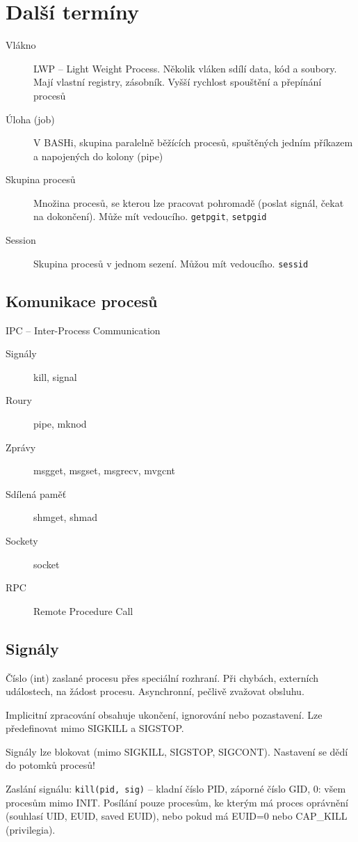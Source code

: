 \documentclass[a4paper, 11pt]{report}
\begin{document}
\section{Další termíny}
\begin{description}
	\item[Vlákno] LWP -- Light Weight Process. Několik vláken sdílí data, kód a soubory. Mají vlastní registry, zásobník. Vyšší rychlost spouštění a přepínání procesů
	\item[Úloha (job)] V BASHi, skupina paralelně běžících procesů, spuštěných jedním příkazem a napojených do kolony (pipe)
	\item[Skupina procesů] Množina procesů, se kterou lze pracovat pohromadě (poslat signál, čekat na dokončení). Může mít vedoucího. \verb|getpgit|, \verb|setpgid|
	\item[Session] Skupina procesů v jednom sezení. Můžou mít vedoucího. \verb|sessid|
\end{description}

\subsection{Komunikace procesů}
IPC -- Inter-Process Communication
\begin{description}
	\item[Signály] kill, signal
	\item[Roury] pipe, mknod
	\item[Zprávy] msgget, msgset, msgrecv, mvgcnt
	\item[Sdílená paměť] shmget, shmad
	\item[Sockety] socket
	\item[RPC] Remote Procedure Call
\end{description}

\subsection{Signály}

Číslo (int) zaslané procesu přes speciální rozhraní. Při chybách, externích událostech, na žádost procesu. Asynchronní, pečlivě zvažovat obsluhu.

Implicitní zpracování obsahuje ukončení, ignorování nebo pozastavení. Lze předefinovat mimo SIGKILL a SIGSTOP.

Signály lze blokovat (mimo SIGKILL, SIGSTOP, SIGCONT). Nastavení se dědí do potomků procesů!

Zaslání signálu: \verb|kill(pid, sig)| -- kladní číslo PID, záporné číslo GID, 0: všem procesům mimo INIT. Posílání pouze procesům, ke kterým má proces oprávnění (souhlasí UID, EUID, saved EUID), nebo pokud má EUID=0 nebo CAP\_KILL (privilegia). 
\end{document}

